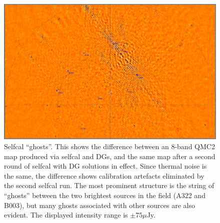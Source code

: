 \documentclass{aps2010} \special{papersize=8.5in,11in}
\begin{document}
\begin{figure}
\center \includegraphics[width=.9\textwidth]{figures-meqtrees/qmc2ghosts} 
\caption{\label{fig:ghosts}Selfcal ``ghosts''. This shows the difference between an 8-band QMC2 map produced via selfcal and DGs, and the same map after a second round of selfcal with DG solutions in effect. Since thermal noise is the same, the difference shows calibration artefacts eliminated by the second selfcal run. The most prominent structure is the string of ``ghosts'' between the two brightest sources in the field (A322 and B003), but many ghosts associated with other sources are also evident. The displayed intensity range is $\pm75 \mu$Jy.}
\end{figure}
\end{document}

